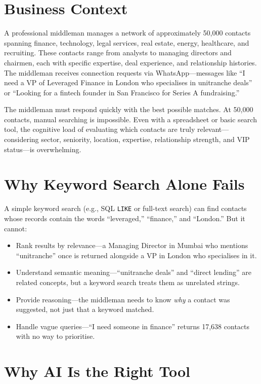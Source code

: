 \documentclass[12pt, a4paper]{report}
\begin{document}
\section{Business Context}

A professional middleman manages a network of approximately 50,000 contacts spanning finance, technology, legal services, real estate, energy, healthcare, and recruiting. These contacts range from analysts to managing directors and chairmen, each with specific expertise, deal experience, and relationship histories. The middleman receives connection requests via WhatsApp---messages like ``I need a VP of Leveraged Finance in London who specialises in unitranche deals'' or ``Looking for a fintech founder in San Francisco for Series A fundraising.''

The middleman must respond quickly with the best possible matches. At 50,000 contacts, manual searching is impossible. Even with a spreadsheet or basic search tool, the cognitive load of evaluating which contacts are truly relevant---considering sector, seniority, location, expertise, relationship strength, and VIP status---is overwhelming.

\section{Why Keyword Search Alone Fails}

A simple keyword search (e.g., SQL \texttt{LIKE} or full-text search) can find contacts whose records contain the words ``leveraged,'' ``finance,'' and ``London.'' But it cannot:

\begin{itemize}[itemsep=4pt]
    \item Rank results by relevance---a Managing Director in Mumbai who mentions ``unitranche'' once is returned alongside a VP in London who specialises in it.
    \item Understand semantic meaning---``unitranche deals'' and ``direct lending'' are related concepts, but a keyword search treats them as unrelated strings.
    \item Provide reasoning---the middleman needs to know \emph{why} a contact was suggested, not just that a keyword matched.
    \item Handle vague queries---``I need someone in finance'' returns 17,638 contacts with no way to prioritise.
\end{itemize}

\section{Why AI Is the Right Tool}
\end{document}
